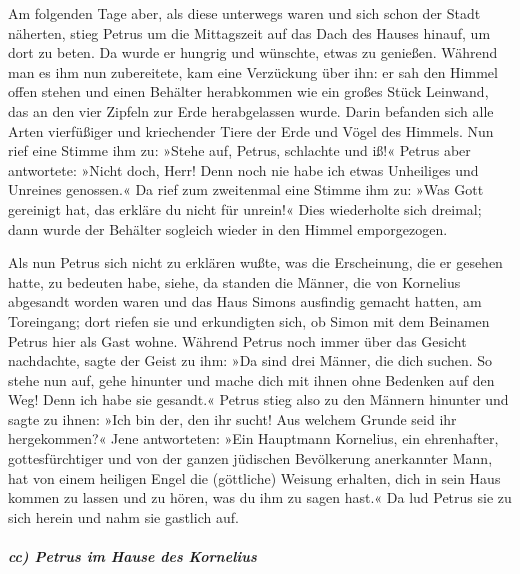  Am folgenden Tage aber, als diese unterwegs waren und
sich schon der Stadt näherten, stieg Petrus um die Mittagszeit auf das
Dach des Hauses hinauf, um dort zu beten.  Da wurde er
hungrig und wünschte, etwas zu genießen. Während man es ihm nun
zubereitete, kam eine Verzückung über ihn:  er sah den
Himmel offen stehen und einen Behälter herabkommen wie ein großes Stück
Leinwand, das an den vier Zipfeln zur Erde herabgelassen wurde.
 Darin befanden sich alle Arten vierfüßiger und
kriechender Tiere der Erde und Vögel des Himmels.  Nun
rief eine Stimme ihm zu: »Stehe auf, Petrus, schlachte und iß!«
 Petrus aber antwortete: »Nicht doch, Herr! Denn noch nie
habe ich etwas Unheiliges und Unreines genossen.«  Da
rief zum zweitenmal eine Stimme ihm zu: »Was Gott gereinigt hat, das
erkläre du nicht für unrein!«  Dies wiederholte sich
dreimal; dann wurde der Behälter sogleich wieder in den Himmel
emporgezogen.

 Als nun Petrus sich nicht zu erklären wußte, was die
Erscheinung, die er gesehen hatte, zu bedeuten habe, siehe, da standen
die Männer, die von Kornelius abgesandt worden waren und das Haus Simons
ausfindig gemacht hatten, am Toreingang;  dort riefen sie
und erkundigten sich, ob Simon mit dem Beinamen Petrus hier als Gast
wohne.  Während Petrus noch immer über das Gesicht
nachdachte, sagte der Geist zu ihm: »Da sind drei Männer, die dich
suchen.  So stehe nun auf, gehe hinunter und mache dich
mit ihnen ohne Bedenken auf den Weg! Denn ich habe sie gesandt.«
 Petrus stieg also zu den Männern hinunter und sagte zu
ihnen: »Ich bin der, den ihr sucht! Aus welchem Grunde seid ihr
hergekommen?«  Jene antworteten: »Ein Hauptmann
Kornelius, ein ehrenhafter, gottesfürchtiger und von der ganzen
jüdischen Bevölkerung anerkannter Mann, hat von einem heiligen Engel die
(göttliche) Weisung erhalten, dich in sein Haus kommen zu lassen und zu
hören, was du ihm zu sagen hast.«  Da lud Petrus sie zu
sich herein und nahm sie gastlich auf.

\hypertarget{cc-petrus-im-hause-des-kornelius}{%
\subparagraph{cc) Petrus im Hause des
Kornelius}\label{cc-petrus-im-hause-des-kornelius}}

